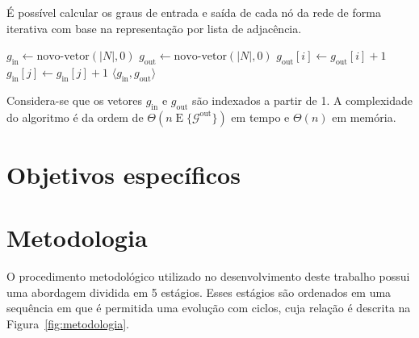 \begin{algoritmo}
\label{alg:graus}
%
É possível calcular os graus de entrada e saída de cada nó da rede
de forma iterativa com base na representação por lista de adjacência.

\begin{algorithmic}[1]
\STATE{}
\STATE $g_\text{in} \leftarrow \text{novo-vetor}(|N|, 0)$
\STATE $g_\text{out} \leftarrow \text{novo-vetor}(|N|, 0)$
        \STATE{}
        \STATE $g_\text{out}[i] \leftarrow g_\text{out}[i] + 1$
        \STATE $g_\text{in}[j] \leftarrow g_\text{in}[j] + 1$
    \ENDFOR
\ENDFOR
\RETURN $\langle g_\text{in}, g_\text{out} \rangle$
\end{algorithmic}
Considera-se que os vetores $g_\text{in}$ e $g_\text{out}$ são indexados a
partir de 1.
A complexidade do algoritmo é da ordem de 
$\Theta(n\operatorname{E}\{\mathcal{G}^\text{out}\})$ em tempo e $\Theta(n)$
em memória.
\end{algoritmo}

\section{Objetivos específicos}
\label{sec:2:objetivos}


\section{Metodologia}
\label{sec:2:metodologia}

O procedimento metodológico utilizado no desenvolvimento deste trabalho
possui uma abordagem dividida em 5 estágios.
Esses estágios são ordenados em uma sequência em que é permitida uma evolução
com ciclos, cuja relação é descrita na Figura~\ref{fig:metodologia}.

